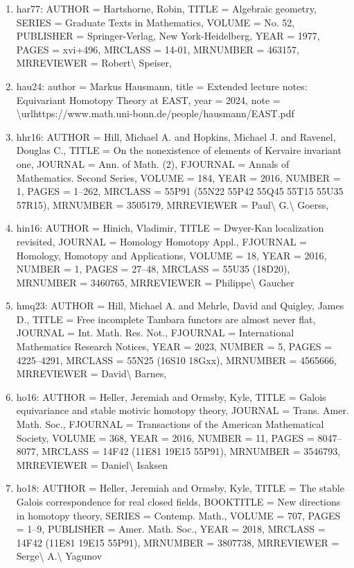 \documentclass[11pt]{article}
\begin{document}
\begin{enumerate}[leftmargin=*]
  \item har77: AUTHOR = Hartshorne, Robin, TITLE = Algebraic geometry, SERIES = Graduate Texts in Mathematics, VOLUME = No. 52, PUBLISHER = Springer-Verlag, New York-Heidelberg, YEAR = 1977, PAGES = xvi+496, MRCLASS = 14-01, MRNUMBER = 463157, MRREVIEWER = Robert\textbackslash{} Speiser,
  \item hau24: author = Markus Hausmann, title = Extended lecture notes: Equivariant Homotopy Theory at EAST, year = 2024, note = \textbackslash{}urlhttps://www.math.uni-bonn.de/people/hausmann/EAST.pdf
  \item hhr16: AUTHOR = Hill, Michael A. and Hopkins, Michael J. and Ravenel, Douglas C., TITLE = On the nonexistence of elements of Kervaire invariant one, JOURNAL = Ann. of Math. (2), FJOURNAL = Annals of Mathematics. Second Series, VOLUME = 184, YEAR = 2016, NUMBER = 1, PAGES = 1--262, MRCLASS = 55P91 (55N22 55P42 55Q45 55T15 55U35 57R15), MRNUMBER = 3505179, MRREVIEWER = Paul\textbackslash{} G.\textbackslash{} Goerss,
  \item hin16: AUTHOR = Hinich, Vladimir, TITLE = Dwyer-Kan localization revisited, JOURNAL = Homology Homotopy Appl., FJOURNAL = Homology, Homotopy and Applications, VOLUME = 18, YEAR = 2016, NUMBER = 1, PAGES = 27--48, MRCLASS = 55U35 (18D20), MRNUMBER = 3460765, MRREVIEWER = Philippe\textbackslash{} Gaucher
  \item hmq23: AUTHOR = Hill, Michael A. and Mehrle, David and Quigley, James D., TITLE = Free incomplete Tambara functors are almost never flat, JOURNAL = Int. Math. Res. Not., FJOURNAL = International Mathematics Research Notices, YEAR = 2023, NUMBER = 5, PAGES = 4225--4291, MRCLASS = 55N25 (16S10 18Gxx), MRNUMBER = 4565666, MRREVIEWER = David\textbackslash{} Barnes,
  \item ho16: AUTHOR = Heller, Jeremiah and Ormsby, Kyle, TITLE = Galois equivariance and stable motivic homotopy theory, JOURNAL = Trans. Amer. Math. Soc., FJOURNAL = Transactions of the American Mathematical Society, VOLUME = 368, YEAR = 2016, NUMBER = 11, PAGES = 8047--8077, MRCLASS = 14F42 (11E81 19E15 55P91), MRNUMBER = 3546793, MRREVIEWER = Daniel\textbackslash{} Isaksen
  \item ho18: AUTHOR = Heller, Jeremiah and Ormsby, Kyle, TITLE = The stable Galois correspondence for real closed fields, BOOKTITLE = New directions in homotopy theory, SERIES = Contemp. Math., VOLUME = 707, PAGES = 1--9, PUBLISHER = Amer. Math. Soc., YEAR = 2018, MRCLASS = 14F42 (11E81 19E15 55P91), MRNUMBER = 3807738, MRREVIEWER = Serge\textbackslash{} A.\textbackslash{} Yagunov

\end{enumerate}
\end{document}
